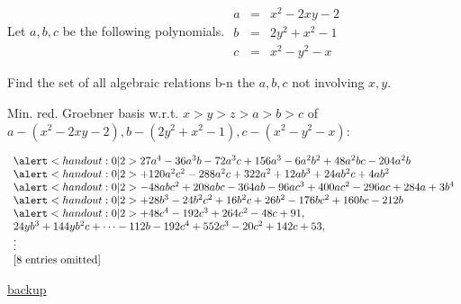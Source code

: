 \begin{frame}
\begin{example}
Let $a,b,c$ be the following polynomials.
$
\begin{array}{rcl}
a&=&x^2-2 x y-2\\
b&=&2y^2 + x^2-1\\
c&=&x^2-y^2 - x
\end{array}
$

Find the set of all algebraic relations b-n the $a,b,c$ not involving $x,y$. 

Min. red. Groebner basis w.r.t. $x>y>z>a>b>c$ of $a-(x^2-2 x y-2),b-(2y^2 + x^2-1), c-(x^2-y^2 - x)$:

\medskip

$
\begin{array}{l}
\alertNoH{2}{27a^{4}-36a^{3}b-72a^{3}c+156a^{3}-6a^{2}b^{2}+48a^{2}bc-204a^{2}b} \\
\alertNoH{2}{+120a^{2}c^{2}-288a^{2}c+322a^{2}+12ab^{3}+24ab^{2}c+4ab^{2}}\\
\alertNoH{2}{-48abc^{2}+208abc-364ab-96ac^{3}+400ac^{2}-296ac+284a+3b^{4}}\\
\alertNoH{2}{+28b^{3}-24b^{2}c^{2}+16b^{2}c+26b^{2}-176bc^{2}+160bc-212b}\\
\alertNoH{2}{+48c^{4}-192c^{3}+264c^{2}-48c+91},\\
24yb^{3}+144yb^{2}c+\dots-112b-192c^{4}+552c^{3}-20c^{2}+142c+53,\\
\vdots\\
\text{[8 entries omitted]}
\end{array}
$
		
\hfill{\tiny 
\href{https://calculator-algebra.org/appNoCache\#\%7B\%22currentPage\%22\%3A\%22calculator\%22\%2C\%22calculatorInput\%22\%3A\%22u\%3Dx\%5E2-2\%20x\%20y-2\%3B\%5Cnv\%3D2y\%5E2\%20\%2B\%20x\%5E2-1\%3B\%5Cnw\%3Dx\%5E2-y\%5E2\%20-\%20x\%3B\%5CnGroebnerLex(a-u\%2Cb-v\%2Cc-w\%2C\%20order\%20\%3D\%20(x\%2Cy\%2Cz\%2Ca\%2Cb\%2Cc)\%2C\%20upperLimit\%3D500000)\%3B\%22\%2C\%22inputFocus\%22\%3Atrue\%7D}{backup}
}
\end{example}
\end{frame}